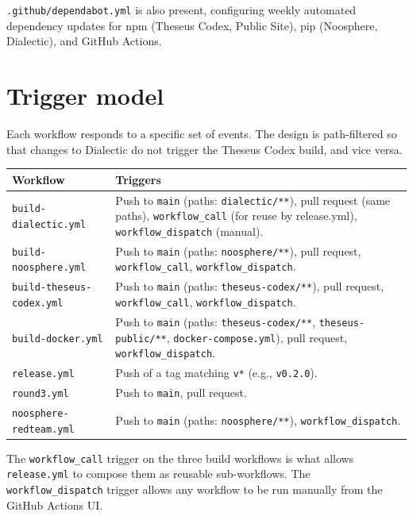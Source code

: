 \documentclass[11pt,letterpaper]{article}
\newcommand{\file}[1]{\texttt{#1}}
\newcommand{\cmd}[1]{\texttt{#1}}
\begin{document}
\file{.github/dependabot.yml} is also present, configuring weekly automated dependency updates for npm (Theseus Codex, Public Site), pip (Noosphere, Dialectic), and GitHub Actions.

\section{Trigger model}

Each workflow responds to a specific set of events. The design is path-filtered so that changes to Dialectic do not trigger the Theseus Codex build, and vice versa.

\begin{longtable}{p{4.2cm} p{10.3cm}}
\toprule
\textbf{Workflow} & \textbf{Triggers} \\
\midrule
\endhead
\file{build-dialectic.yml}      & Push to \cmd{main} (paths: \file{dialectic/**}), pull request (same paths), \cmd{workflow\_call} (for reuse by release.yml), \cmd{workflow\_dispatch} (manual). \\
\file{build-noosphere.yml}      & Push to \cmd{main} (paths: \file{noosphere/**}), pull request, \cmd{workflow\_call}, \cmd{workflow\_dispatch}. \\
\file{build-theseus-codex.yml} & Push to \cmd{main} (paths: \file{theseus-codex/**}), pull request, \cmd{workflow\_call}, \cmd{workflow\_dispatch}. \\
\file{build-docker.yml}         & Push to \cmd{main} (paths: \file{theseus-codex/**}, \file{theseus-public/**}, \file{docker-compose.yml}), pull request, \cmd{workflow\_dispatch}. \\
\file{release.yml}              & Push of a tag matching \cmd{v*} (e.g., \cmd{v0.2.0}). \\
\file{round3.yml}               & Push to \cmd{main}, pull request. \\
\file{noosphere-redteam.yml}    & Push to \cmd{main} (paths: \file{noosphere/**}), \cmd{workflow\_dispatch}. \\
\bottomrule
\end{longtable}

The \cmd{workflow\_call} trigger on the three build workflows is what allows \file{release.yml} to compose them as reusable sub-workflows. The \cmd{workflow\_dispatch} trigger allows any workflow to be run manually from the GitHub Actions UI.
\end{document}
